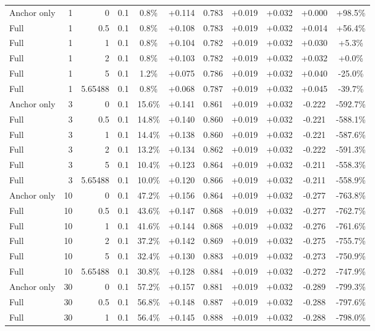 \begin{table}[htbp]
\begin{tabular}{lrrrccccccc}
Anchor only & 1 & 0 & 0.1 & 0.8\% & +0.114 & 0.783 & +0.019 & +0.032 & +0.000 & +98.5\% \\
Full & 1 & 0.5 & 0.1 & 0.8\% & +0.108 & 0.783 & +0.019 & +0.032 & +0.014 & +56.4\% \\
Full & 1 & 1 & 0.1 & 0.8\% & +0.104 & 0.782 & +0.019 & +0.032 & +0.030 & +5.3\% \\
Full & 1 & 2 & 0.1 & 0.8\% & +0.103 & 0.782 & +0.019 & +0.032 & +0.032 & +0.0\% \\
Full & 1 & 5 & 0.1 & 1.2\% & +0.075 & 0.786 & +0.019 & +0.032 & +0.040 & -25.0\% \\
Full & 1 & 5.65488 & 0.1 & 0.8\% & +0.068 & 0.787 & +0.019 & +0.032 & +0.045 & -39.7\% \\
Anchor only & 3 & 0 & 0.1 & 15.6\% & +0.141 & 0.861 & +0.019 & +0.032 & -0.222 & -592.7\% \\
Full & 3 & 0.5 & 0.1 & 14.8\% & +0.140 & 0.860 & +0.019 & +0.032 & -0.221 & -588.1\% \\
Full & 3 & 1 & 0.1 & 14.4\% & +0.138 & 0.860 & +0.019 & +0.032 & -0.221 & -587.6\% \\
Full & 3 & 2 & 0.1 & 13.2\% & +0.134 & 0.862 & +0.019 & +0.032 & -0.222 & -591.3\% \\
Full & 3 & 5 & 0.1 & 10.4\% & +0.123 & 0.864 & +0.019 & +0.032 & -0.211 & -558.3\% \\
Full & 3 & 5.65488 & 0.1 & 10.0\% & +0.120 & 0.866 & +0.019 & +0.032 & -0.211 & -558.9\% \\
Anchor only & 10 & 0 & 0.1 & 47.2\% & +0.156 & 0.864 & +0.019 & +0.032 & -0.277 & -763.8\% \\
Full & 10 & 0.5 & 0.1 & 43.6\% & +0.147 & 0.868 & +0.019 & +0.032 & -0.277 & -762.7\% \\
Full & 10 & 1 & 0.1 & 41.6\% & +0.144 & 0.868 & +0.019 & +0.032 & -0.276 & -761.6\% \\
Full & 10 & 2 & 0.1 & 37.2\% & +0.142 & 0.869 & +0.019 & +0.032 & -0.275 & -755.7\% \\
Full & 10 & 5 & 0.1 & 32.4\% & +0.130 & 0.883 & +0.019 & +0.032 & -0.273 & -750.9\% \\
Full & 10 & 5.65488 & 0.1 & 30.8\% & +0.128 & 0.884 & +0.019 & +0.032 & -0.272 & -747.9\% \\
Anchor only & 30 & 0 & 0.1 & 57.2\% & +0.157 & 0.881 & +0.019 & +0.032 & -0.289 & -799.3\% \\
Full & 30 & 0.5 & 0.1 & 56.8\% & +0.148 & 0.887 & +0.019 & +0.032 & -0.288 & -797.6\% \\
Full & 30 & 1 & 0.1 & 56.4\% & +0.145 & 0.888 & +0.019 & +0.032 & -0.288 & -798.0\% \\

\end{tabular}
\end{table}
